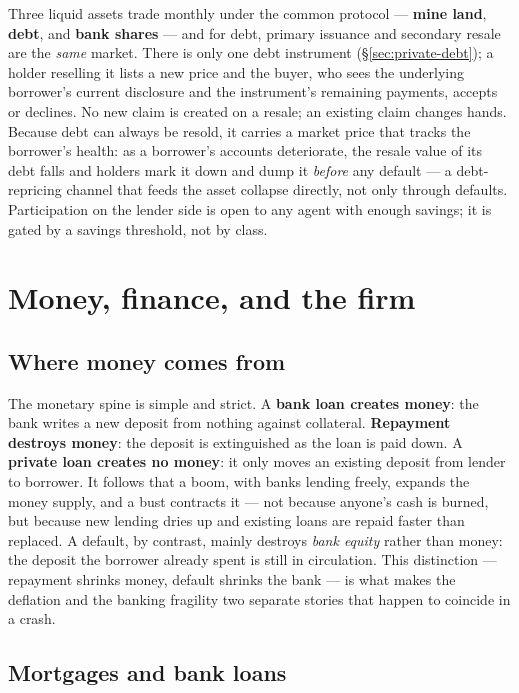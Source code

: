 \documentclass[11pt]{article}
\begin{document}
Three liquid assets trade monthly under the common protocol --- \textbf{mine
land}, \textbf{debt}, and \textbf{bank shares} --- and for debt, primary
issuance and secondary resale are the \emph{same} market. There is only one debt
instrument (\S\ref{sec:private-debt}); a holder reselling it lists a new price
and the buyer, who sees the underlying borrower's current disclosure and the
instrument's remaining payments, accepts or declines. No new claim is created on
a resale; an existing claim changes hands. Because debt can always be resold, it
carries a market price that tracks the borrower's health: as a borrower's
accounts deteriorate, the resale value of its debt falls and holders mark it
down and dump it \emph{before} any default --- a debt-repricing channel that
feeds the asset collapse directly, not only through defaults. Participation on
the lender side is open to any agent with enough savings; it is gated by a
savings threshold, not by class.

\section{Money, finance, and the firm}

\subsection{Where money comes from}
\label{sec:money}

The monetary spine is simple and strict. A \textbf{bank loan creates money}: the
bank writes a new deposit from nothing against collateral. \textbf{Repayment
destroys money}: the deposit is extinguished as the loan is paid down. A
\textbf{private loan creates no money}: it only moves an existing deposit from
lender to borrower. It follows that a boom, with banks lending freely, expands
the money supply, and a bust contracts it --- not because anyone's cash is
burned, but because new lending dries up and existing loans are repaid faster
than replaced. A default, by contrast, mainly destroys \emph{bank equity}
rather than money: the deposit the borrower already spent is still in
circulation. This distinction --- repayment shrinks money, default shrinks the
bank --- is what makes the deflation and the banking fragility two separate
stories that happen to coincide in a crash.

\subsection{Mortgages and bank loans}
\label{sec:mortgage}
\end{document}
